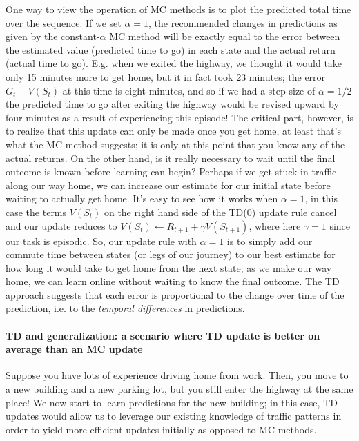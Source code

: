 \documentclass[12pt]{article}
\begin{document}
One way to view the operation of MC methods is to plot the predicted total time over the sequence. If we set $\alpha = 1$, the recommended changes in predictions as given by the constant-$\alpha$ MC method will be exactly equal to the error between the estimated value (predicted time to go) in each state and the actual return (actual time to go). E.g. when we exited the highway, we thought it would take only 15 minutes more to get home, but it in fact took 23 minutes; the error $G_t - V(S_t)$ at this time is eight minutes, and so if we had a step size of $\alpha = 1/2$ the predicted time to go after exiting the highway would be revised upward by four minutes as a result of experiencing this episode! The critical part, however, is to realize that this update can only be made once you get home, at least that's what the MC method suggests; it is only at this point that you know any of the actual returns.
On the other hand, is it really necessary to wait until the final outcome is known before learning can begin?  Perhaps if we get stuck in traffic along our way home, we can increase our estimate for our initial state before waiting to actually get home.
It's easy to see how it works when $\alpha = 1$, in this case the terms $V(S_t)$ on the right hand side of the TD(0) update rule cancel and our update reduces to $V(S_t) \gets R_{t+1} + \gamma V(S_{t+1})$, where here $\gamma = 1$ since our task is episodic. So, our update rule with $\alpha = 1$ is to simply add our commute time between states (or legs of our journey) to our best estimate for how long it would take to get home from the next state; as we make our way home, we can learn online without waiting to know the final outcome.
The TD approach suggests that each error is proportional to the change over time of the prediction, i.e. to the \emph{temporal differences} in predictions.

\paragraph{TD and generalization: a scenario where TD update is better on average than an MC update} Suppose you have lots of experience driving home from work. Then, you move to a new building and a new parking lot, but you still enter the highway at the same place! We now start to learn predictions for the new building; in this case, TD updates would allow us to leverage our existing knowledge of traffic patterns in order to yield more efficient updates initially as opposed to MC methods.
\end{document}
